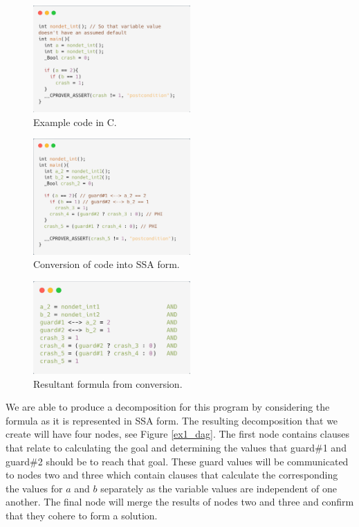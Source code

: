 \documentclass[
10pt, %
a4paper, %
oneside, %
headinclude,footinclude, %
BCOR5mm, %
]{scrartcl}
\begin{document}
\begin{figure}[h]
  \centering
  \includegraphics[width=6cm]{./figs/ex1_code.png}
  \caption{Example code in C.}
  \label{ex1_code}
\end{figure}
\begin{figure}[h]
  \centering
  \includegraphics[width=6cm]{./figs/ex1_ssa.png}
  \caption{Conversion of code into SSA form.}
  \label{ex1_ssa}
\end{figure}
\begin{figure}[h]
  \centering
  \includegraphics[width=6cm]{./figs/ex1_formula.png}
  \caption{Resultant formula from conversion.}
  \label{ex1_formula}
\end{figure}

We are able to produce a decomposition for this program by considering the formula as it is represented in SSA form. The resulting decomposition that we create will have four nodes, see Figure \ref{ex1_dag}. The first node contains clauses that relate to calculating the goal and determining the values that guard\#1 and guard\#2 should be to reach that goal. These guard values will be communicated to nodes two and three which contain clauses that calculate the corresponding the values for $a$ and $b$ separately as the variable values are independent of one another. The final node will merge the results of nodes two and three and confirm that they cohere to form a solution.
\end{document}
